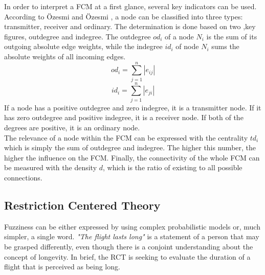 \documentclass[conference]{IEEEtran}
\begin{document}
In order to interpret a FCM at a first glance, several key indicators can be used. According to \"Ozesmi and \"Ozesmi \cite{ozesmi2004}, a node can be classified into three types: transmitter, receiver and ordinary. The determination is done based on two ,key figures, outdegree and indegree. The outdegree \begin{math} od_{i} \end{math} of a node \begin{math} N_{i} \end{math} is the sum of its outgoing absolute edge weights, while the indegree \begin{math} id_{i} \end{math} of node \begin{math} N_{i} \end{math} sums the absolute weights of all incoming edges.\\
\begin{equation}
od_{i} = \sum_{j=1}^{n}|e_{ij}|
\end{equation}
\begin{equation}
id_{i} = \sum_{j=1}^{n}|e_{ji}|
\end{equation}
If a node has a positive outdegree and zero indegree, it is a transmitter node. If it has zero outdegree and positive indegree, it is a receiver node. If both of the degrees are positive, it is an ordinary node.\\
The relevance of a node within the FCM can be expressed with the centrality \begin{math}td_{i} \end{math} which is simply the sum of outdegree and indegree. The higher this number, the higher the influence on the FCM. Finally, the connectivity of the whole FCM can be measured with the density \begin{math} d \end{math}, which is the ratio of existing to all possible connections.\\

\subsection{Restriction Centered Theory}
Fuzziness can be either expressed by using complex probabilistic models or, much simpler, a single word. \emph{"The flight lasts long"} is a statement of a person that may be grasped differently, even though there is a conjoint understanding about the concept of longevity. In brief, the RCT is seeking to evaluate the duration of a flight that is perceived as being long.
\end{document}

